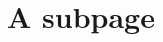 \section{A subpage}
\label{\detokenize{subfolder/asubpage:a-subpage}}\label{\detokenize{subfolder/asubpage::doc}}






\renewcommand{\indexname}{Index}
\printindex
